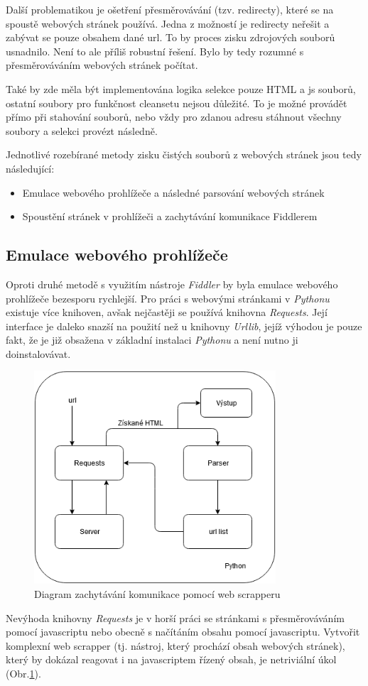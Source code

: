 \documentclass[thesis=M,czech,hidelinks]{FITthesis}[2013/05/06]
\begin{document}
Další problematikou je ošetření přesměrovávání (tzv. redirecty), které se na spoustě webových stránek používá. Jedna z možností je redirecty neřešit a zabývat se pouze obsahem dané url. To by proces zisku zdrojových souborů usnadnilo. Není to ale příliš robustní řešení. Bylo by tedy rozumné s přesměrováváním webových stránek počítat. 

Také by zde měla být implementována logika selekce pouze HTML a js souborů, ostatní soubory pro funkčnost cleansetu nejsou důležité. To je možné provádět přímo při stahování souborů, nebo vždy pro zdanou adresu stáhnout všechny soubory a selekci provézt následně.

Jednotlivé rozebírané metody zisku čistých souborů z webových stránek jsou tedy následující:
\begin{itemize}
	\item Emulace webového prohlížeče a následné parsování webových stránek 
	\item Spoustění stránek v prohlížeči a zachytávání komunikace Fiddlerem
\end{itemize}

\subsection{Emulace webového prohlížeče} \label{sec:parsing}
Oproti druhé metodě s využitím nástroje \textit{Fiddler} by byla emulace webového prohlížeče bezesporu rychlejší. Pro práci s webovými stránkami v \textit{Pythonu} existuje více knihoven, avšak nejčastěji se používá knihovna \textit{Requests}. Její interface je daleko snazší na použití než u knihovny \textit{Urllib}, jejíž výhodou je pouze fakt, že je již obsažena v základní instalaci \textit{Pythonu} a není nutno ji doinstalovávat. 
\begin{figure}[h]
	\centering
	\includegraphics[width=9cm]{pictures/scrapper.png}
	\caption{Diagram zachytávání komunikace pomocí web scrapperu}
	\label{fig:web_scrapper}
\end{figure}
Nevýhoda knihovny \textit{Requests} je v horší práci se stránkami s přesměrováváním pomocí javascriptu nebo obecně s načítáním obsahu pomocí javascriptu. Vytvořit komplexní web scrapper (tj. nástroj, který prochází obsah webových stránek), který by dokázal reagovat i na javascriptem řízený obsah, je netriviální úkol (Obr.\ref{fig:web_scrapper}). 
\end{document}
